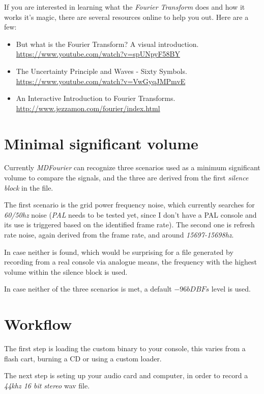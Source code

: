 \documentclass[10pt,a4paper]{report}
\begin{document}
If you are interested in learning what the \textit{Fourier Transform} does and how it works it's magic, there are several resources online to help you out. Here are a few:

\begin{itemize}
	\item But what is the Fourier Transform? A visual introduction.  \url{https://www.youtube.com/watch?v=spUNpyF58BY}
	\item The Uncertainty Principle and Waves - Sixty Symbols.  \url{https://www.youtube.com/watch?v=VwGyqJMPmvE}
	\item An Interactive Introduction to Fourier Transforms.  \url{http://www.jezzamon.com/fourier/index.html}
\end{itemize}


\section{Minimal significant volume}
\label{MinSigVolume}

Currently \textit{MDFourier} can recognize three scenarios used as a minimum significant volume to compare the signals, and the three are derived from the first \textit{silence block} in the file.

The first scenario is the grid power frequency noise, which currently searches for \textit{60/50hz} noise (\textit{PAL} needs to be tested yet, since I don't have a PAL console and its use is triggered based on the identified frame rate). The second one is refresh rate noise, again derived from the frame rate, and around \textit{15697-15698hz}. 

In case neither is found, which would be surprising for a file generated by recording from a real console via analogue means, the frequency with the highest volume within the silence block is used. 

In case neither of the three scenarios is met, a default $-96bDBFs$ level is used.


\section{Workflow}

The first step is loading the custom binary to your console, this varies from a flash cart, burning a CD or using a custom loader.

The next step is seting up your audio card and computer, in order to record a \textit{44khz 16 bit stereo} wav file.
\end{document}
